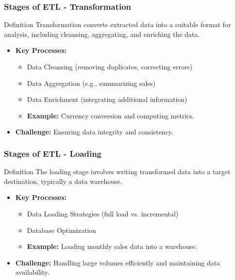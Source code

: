 \documentclass[aspectratio=169]{beamer}
\begin{document}
\begin{frame}[fragile]
    \frametitle{Stages of ETL - Transformation}
    \begin{block}{Definition}
        Transformation converts extracted data into a suitable format for analysis, including cleansing, aggregating, and enriching the data.
    \end{block}
    \begin{itemize}
        \item \textbf{Key Processes:}
        \begin{itemize}
            \item Data Cleansing (removing duplicates, correcting errors)
            \item Data Aggregation (e.g., summarizing sales)
            \item Data Enrichment (integrating additional information)
            \item \textbf{Example:} Currency conversion and computing metrics.
        \end{itemize}
        \item \textbf{Challenge:} Ensuring data integrity and consistency.
    \end{itemize}
\end{frame}

\begin{frame}[fragile]
    \frametitle{Stages of ETL - Loading}
    \begin{block}{Definition}
        The loading stage involves writing transformed data into a target destination, typically a data warehouse.
    \end{block}
    \begin{itemize}
        \item \textbf{Key Processes:}
        \begin{itemize}
            \item Data Loading Strategies (full load vs. incremental)
            \item Database Optimization
            \item \textbf{Example:} Loading monthly sales data into a warehouse.
        \end{itemize}
        \item \textbf{Challenge:} Handling large volumes efficiently and maintaining data availability.
    \end{itemize}
\end{frame}
\end{document}
